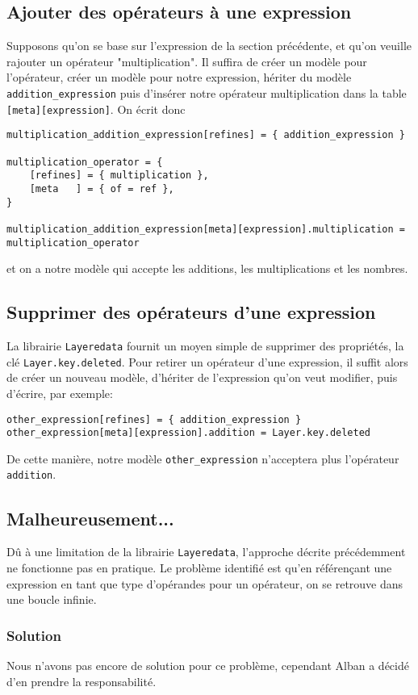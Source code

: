 \documentclass{article}
\begin{document}
\subsection{Ajouter des opérateurs à une expression}
Supposons qu'on se base sur l'expression de la section précédente, et qu'on veuille rajouter un opérateur "multiplication". Il suffira de créer un modèle pour l'opérateur, créer un modèle pour notre expression, hériter du modèle \lstinline|addition_expression| puis d'insérer notre opérateur multiplication dans la table \lstinline|[meta][expression]|. On écrit donc
\begin{verbatim}
multiplication_addition_expression[refines] = { addition_expression }

multiplication_operator = {
	[refines] = { multiplication },
	[meta   ] = { of = ref },
}

multiplication_addition_expression[meta][expression].multiplication = multiplication_operator
\end{verbatim}
et on a notre modèle qui accepte les additions, les multiplications et les nombres.
\subsection{Supprimer des opérateurs d'une expression}
La librairie \lstinline|Layeredata| fournit un moyen simple de supprimer des propriétés, la clé \lstinline|Layer.key.deleted|. Pour retirer un opérateur d'une expression, il suffit alors de créer un nouveau modèle, d'hériter de l'expression qu'on veut modifier, puis d'écrire, par exemple:
\begin{verbatim}
other_expression[refines] = { addition_expression }
other_expression[meta][expression].addition = Layer.key.deleted
\end{verbatim}
De cette manière, notre modèle \lstinline|other_expression| n'acceptera plus l'opérateur \lstinline|addition|.
\subsection{Malheureusement...}
Dû à une limitation de la librairie \lstinline|Layeredata|, l'approche décrite précédemment ne fonctionne pas en pratique. Le problème identifié est qu'en référençant une expression en tant que type d'opérandes pour un opérateur, on se retrouve dans une boucle infinie.
\subsubsection{Solution}
Nous n'avons pas encore de solution pour ce problème, cependant Alban a décidé d'en prendre la responsabilité.
\end{document}
